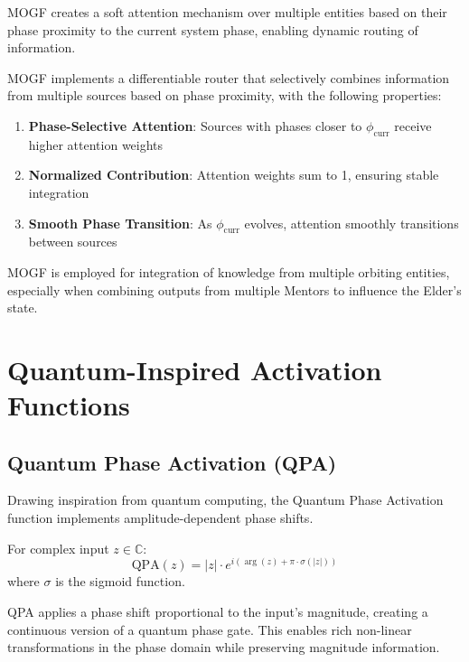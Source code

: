 MOGF creates a soft attention mechanism over multiple entities based on their phase proximity to the current system phase, enabling dynamic routing of information.

\begin{theorem}
MOGF implements a differentiable router that selectively combines information from multiple sources based on phase proximity, with the following properties:
\begin{enumerate}
    \item \textbf{Phase-Selective Attention}: Sources with phases closer to $\phi_{\text{curr}}$ receive higher attention weights
    \item \textbf{Normalized Contribution}: Attention weights sum to 1, ensuring stable integration
    \item \textbf{Smooth Phase Transition}: As $\phi_{\text{curr}}$ evolves, attention smoothly transitions between sources
\end{enumerate}
\end{theorem}

MOGF is employed for integration of knowledge from multiple orbiting entities, especially when combining outputs from multiple Mentors to influence the Elder's state.

\section{Quantum-Inspired Activation Functions}

\subsection{Quantum Phase Activation (QPA)}

Drawing inspiration from quantum computing, the Quantum Phase Activation function implements amplitude-dependent phase shifts.

\begin{definition}
For complex input $z \in \mathbb{C}$:
\begin{equation}
\text{QPA}(z) = |z| \cdot e^{i(\arg(z) + \pi \cdot \sigma(|z|))}
\end{equation}
where $\sigma$ is the sigmoid function.
\end{definition}

QPA applies a phase shift proportional to the input's magnitude, creating a continuous version of a quantum phase gate. This enables rich non-linear transformations in the phase domain while preserving magnitude information.

